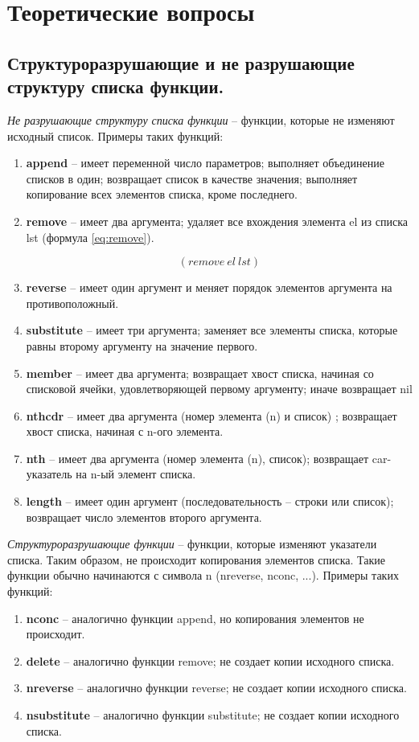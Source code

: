 \chapter{Теоретические вопросы}
\section{Структуроразрушающие и не разрушающие структуру списка функции.}
\textit{Не разрушающие структуру списка функции} -- функции, которые не изменяют исходный список. Примеры таких функций:
\begin{enumerate}
	\item \textbf{append} -- имеет переменной число параметров; выполняет объединение списков в один; возвращает список в качестве значения; выполняет копирование всех элементов списка, кроме последнего.
	\item \textbf{remove} -- имеет два аргумента; удаляет все вхождения элемента el из списка lst (формула \ref{eq:remove}).
	
	\begin{equation}
		\label{eq:remove}
		(remove\ el\ lst)
	\end{equation}

	\item{\textbf{reverse}} -- имеет один аргумент и меняет порядок элементов аргумента на противоположный.
	\item{\textbf{substitute}} -- имеет три аргумента; заменяет все элементы списка, которые равны второму аргументу на значение первого.
	\item{\textbf{member}} -- имеет два аргумента; возвращает хвост списка, начиная со списковой ячейки, удовлетворяющей первому аргументу; иначе возвращает nil
	\item{\textbf{nthcdr}} -- имеет два аргумента (номер элемента (n) и список) ; возвращает хвост списка, начиная с n-ого элемента.
	\item{\textbf{nth}} -- имеет два аргумента (номер элемента (n), список); возвращает car-указатель на n-ый элемент списка.
	\item{\textbf{length}} -- имеет один аргумент (последовательность -- строки или список); возвращает число элементов второго аргумента.
\end{enumerate}

\textit{Структуроразрушающие функции} -- функции, которые изменяют указатели списка. Таким образом, не происходит копирования элементов списка. Такие функции обычно начинаются с символа n (nreverse, nconc, ...). Примеры таких функций:
\begin{enumerate}
	\item \textbf{nconc} -- аналогично функции append, но копирования элементов не происходит.
	\item \textbf{delete} -- аналогично функции remove; не создает копии исходного списка.
	\item \textbf{nreverse} -- аналогично функции reverse; не создает копии исходного списка.
	\item \textbf{nsubstitute} -- аналогично функции substitute; не создает копии исходного списка.
\end{enumerate}



